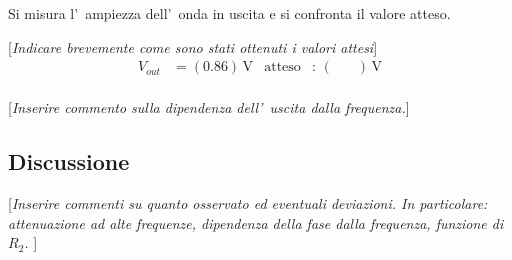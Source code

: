 \documentclass[10pt,a4paper]{article}
\newcommand{\rem}[1]{[\emph{#1}]}
\newcommand{\exn}{\phantom{xxx}}
\begin{document}
Si misura l'~ampiezza dell'~onda  in uscita e si confronta il valore atteso.

\rem{Indicare brevemente come sono stati ottenuti i valori attesi}
\begin{align*}
V_{out} &= (0.86 )\,\mathrm{V} & \mathrm{atteso} &:\,(\exn  )\, \mathrm{V}  \\
\end{align*}

\rem{Inserire commento sulla dipendenza dell'~uscita dalla frequenza.}
%

\subsection{Discussione}
 
\rem{Inserire commenti su quanto osservato ed eventuali deviazioni. 
In particolare: attenuazione ad alte frequenze, dipendenza della fase dalla frequenza, funzione di $R_2$. }

\end{document}
